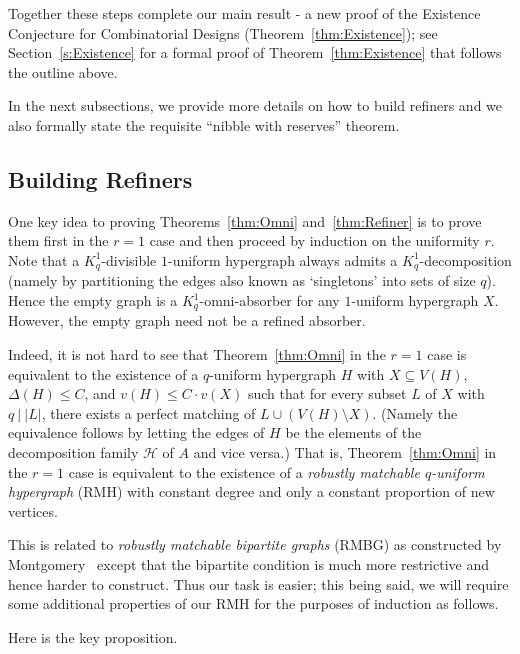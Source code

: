 \documentclass[11pt]{article}
\newcounter{i}
\theoremstyle{plain}
\theoremstyle{plain} %
\theoremstyle{definition}
\begin{document}
Together these steps complete our main result -  a new proof of the Existence Conjecture for Combinatorial Designs (Theorem~\ref{thm:Existence}); see Section~\ref{s:Existence} for a formal proof of Theorem~\ref{thm:Existence} that follows the outline above.

In the next subsections, we provide more details on how to build refiners and we also formally state the requisite ``nibble with reserves'' theorem.

\subsection{Building Refiners}

One key idea to proving Theorems~\ref{thm:Omni} and~\ref{thm:Refiner} is to prove them first in the $r=1$ case and then proceed by induction on the uniformity $r$. Note that a $K_q^1$-divisible $1$-uniform hypergraph always admits a $K_q^1$-decomposition (namely by partitioning the edges also known as `singletons' into sets of size $q$). Hence the empty graph is a $K_q^1$-omni-absorber for any $1$-uniform hypergraph $X$. However, the empty graph need not be a refined absorber.

Indeed, it is not hard to see that Theorem~\ref{thm:Omni} in the $r=1$ case is equivalent to the existence of a $q$-uniform hypergraph $H$ with $X\subseteq V(H)$, $\Delta(H)\le C$, and $v(H)\le C\cdot v(X)$ such that for every subset $L$ of $X$ with $q~|~|L|$, there exists a perfect matching of $L\cup (V(H)\setminus X)$. (Namely the equivalence follows by letting the edges of $H$ be the elements of the decomposition family $\mathcal{H}$ of $A$ and vice versa.) That is, Theorem~\ref{thm:Omni} in the $r=1$ case is equivalent to the existence of a \emph{robustly matchable $q$-uniform hypergraph} (RMH) with constant degree and only a constant proportion of new vertices. 

This is related to \emph{robustly matchable bipartite graphs} (RMBG) as constructed by Montgomery~\cite{M19b} except that the bipartite condition is much more restrictive and hence harder to construct. Thus our task is easier; this being said, we will require some additional properties of our RMH for the purposes of induction as follows.

Here is the key proposition.
\end{document}
